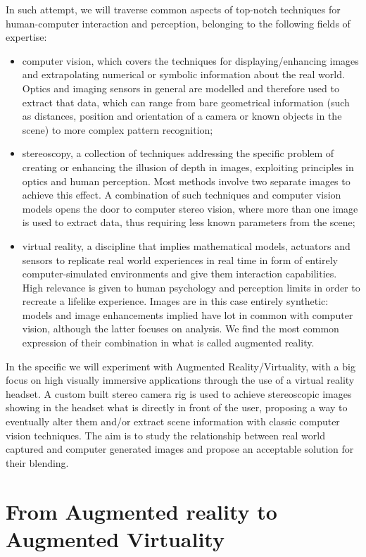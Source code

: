In such attempt, we will traverse common aspects of top-notch techniques for human-computer interaction and perception, belonging to the following fields of expertise:
\begin{itemize}
\item computer vision, which covers the techniques for displaying/enhancing images and extrapolating numerical or symbolic information about the real world. Optics and imaging sensors in general are modelled and therefore used to extract that data, which can range from bare geometrical information (such as distances, position and orientation of a camera or known objects in the scene) to more complex pattern recognition;
\item stereoscopy, a collection of techniques addressing the specific problem of creating or enhancing the illusion of depth in images, exploiting principles in optics and human perception. Most methods involve two separate images to achieve this effect. A combination of such techniques and computer vision models opens the door to computer stereo vision, where more than one image is used to extract data, thus requiring less known parameters from the scene;
\item virtual reality, a discipline that implies mathematical models, actuators and sensors to replicate real world experiences in real time in form of entirely computer-simulated environments and give them interaction capabilities. High relevance is given to human psychology and perception limits in order to recreate a lifelike experience. Images are in this case entirely synthetic: models and image enhancements implied have lot in common with computer vision, although the latter focuses on analysis. We find the most common expression of their combination in what is called augmented reality.
\end{itemize}

In the specific we will experiment with Augmented Reality/Virtuality, with a big focus on high visually immersive applications through the use of a virtual reality headset. A custom built stereo camera rig is used to achieve stereoscopic images showing in the headset what is directly in front of the user, proposing a way to eventually alter them and/or extract scene information with classic computer vision techniques. The aim is to study the relationship between real world captured and computer generated images and propose an acceptable solution for their blending.

\section{From Augmented reality to Augmented Virtuality}


